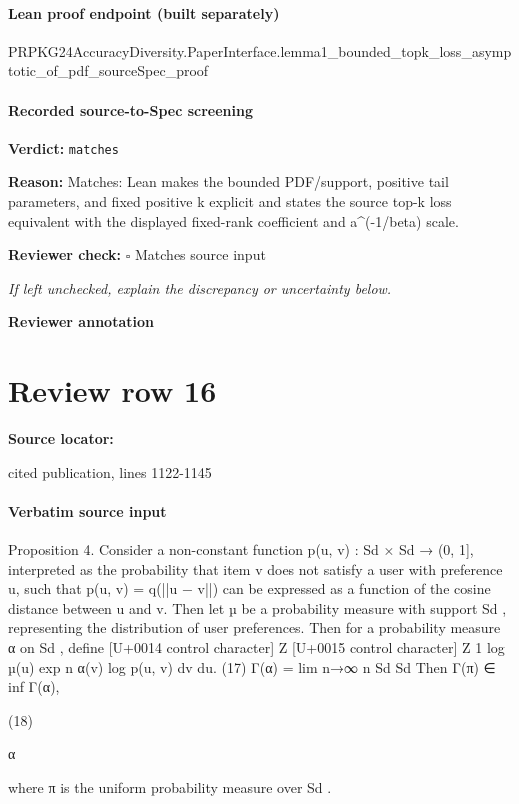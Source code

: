 \documentclass[10pt]{article}
\newcommand{\reviewerbox}{%
  \par\noindent\fbox{\parbox{0.96\linewidth}{\rule{0pt}{0.38in}}}\par
}
\newcommand{\reviewmatch}[1]{%
  \par\noindent\textbf{Reviewer check:} $\square$\; #1\par
  \noindent\emph{If left unchecked, explain the discrepancy or uncertainty below.}\par
}
\begin{document}
\paragraph{Lean proof endpoint (built separately)}\begin{ReviewVerbatim}
PRPKG24AccuracyDiversity.PaperInterface.lemma1_bounded_topk_loss_asymptotic_of_pdf_sourceSpec_proof
\end{ReviewVerbatim}

\paragraph{Recorded source-to-Spec screening}
\textbf{Verdict:} \texttt{matches}
\\
{\raggedright
\textbf{Reason:} Matches:\allowbreak{} Lean makes the bounded PDF/\allowbreak{}support, positive tail parameters, and fixed positive k explicit and states the source top-\allowbreak{}k loss equivalent with the displayed fixed-\allowbreak{}rank coefficient and a\textasciicircum{}(-\allowbreak{}1/\allowbreak{}beta) scale.\allowbreak{}
\par}
\reviewmatch{Matches source input}
\noindent\textbf{Reviewer annotation}\par
\reviewerbox
\clearpage
\hypertarget{source-claim-28a8fb49d83f5d5a}{}
\section*{Review row 16}
\textbf{Source locator:} {\footnotesize\raggedright cited publication, lines 1122-\allowbreak{}1145\par}
\paragraph{Verbatim source input}
\begin{ReviewVerbatim}
Proposition 4. Consider a non-constant function p(u, v) : Sd × Sd → (0, 1], interpreted as the probability
that item v does not satisfy a user with preference u, such that p(u, v) = q(||u − v||) can be expressed as
a function of the cosine distance between u and v. Then let µ be a probability measure with support Sd ,
representing the distribution of user preferences. Then for a probability measure α on Sd , define
[U+0014 control character] Z
[U+0015 control character]
Z
1
log
µ(u) exp n
α(v) log p(u, v) dv du.
(17)
Γ(α) = lim
n→∞ n
Sd
Sd
Then
Γ(π) ∈ inf Γ(α),

(18)

α

where π is the uniform probability measure over Sd .
\end{ReviewVerbatim}
\end{document}
